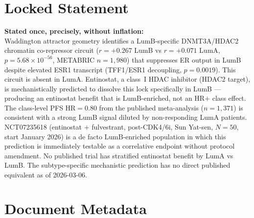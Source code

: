 \documentclass[12pt, a4paper]{article}
\begin{document}
\section{Locked Statement}

\begin{center}
\colorbox{findingbox}{
\begin{minipage}{0.88\textwidth}
\vspace{0.6em}
\textbf{Stated once, precisely, without
inflation:}\\[0.5em]
Waddington attractor geometry identifies a
LumB-specific DNMT3A/HDAC2 chromatin co-repressor
circuit ($r=+0.267$ LumB vs $r=+0.071$ LumA,
$p=5.68\times10^{-56}$, METABRIC $n=1{,}980$)
that suppresses ER output in LumB despite elevated
ESR1 transcript (TFF1/ESR1 decoupling, $p=0.0019$).
This circuit is absent in LumA. Entinostat, a
class~I HDAC inhibitor (HDAC2 target), is
mechanistically predicted to dissolve this lock
specifically in LumB --- producing an entinostat
benefit that is LumB-enriched, not an HR$+$ class
effect. The class-level PFS HR$=0.80$ from the
published meta-analysis ($n=1{,}371$) is consistent
with a strong LumB signal diluted by non-responding
LumA patients. NCT07235618 (entinostat $+$
fulvestrant, post-CDK4/6i, Sun Yat-sen, $N=50$,
start January 2026) is a de facto LumB-enriched
population in which this prediction is immediately
testable as a correlative endpoint without protocol
amendment. No published trial has stratified
entinostat benefit by LumA vs LumB. The subtype-specific
mechanistic prediction has no direct published
equivalent as of 2026-03-06.
\vspace{0.5em}
\end{minipage}}
\end{center}

\section{Document Metadata}
\end{document}
